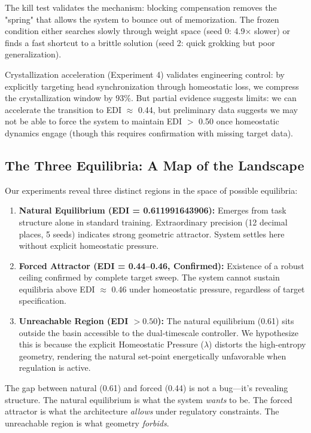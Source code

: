 The kill test validates the mechanism: blocking compensation removes the "spring" that allows the system to bounce out of memorization. The frozen condition either searches slowly through weight space (seed 0: 4.9× slower) or finds a fast shortcut to a brittle solution (seed 2: quick grokking but poor generalization).

Crystallization acceleration (Experiment 4) validates engineering control: by explicitly targeting head synchronization through homeostatic loss, we compress the crystallization window by 93\%. But partial evidence suggests limits: we can accelerate the transition to EDI $\approx$ 0.44, but preliminary data suggests we may not be able to force the system to maintain EDI $>$ 0.50 once homeostatic dynamics engage (though this requires confirmation with missing target data).

\subsection{The Three Equilibria: A Map of the Landscape}

Our experiments reveal three distinct regions in the space of possible equilibria:

\begin{enumerate}
\item \textbf{Natural Equilibrium (EDI = 0.611991643906):} Emerges from task structure alone in standard training. Extraordinary precision (12 decimal places, 5 seeds) indicates strong geometric attractor. System settles here without explicit homeostatic pressure.

\item \textbf{Forced Attractor (EDI = 0.44--0.46, Confirmed):} Existence of a robust ceiling confirmed by complete target sweep. The system cannot sustain equilibria above EDI $\approx$ 0.46 under homeostatic pressure, regardless of target specification.

\item \textbf{Unreachable Region (EDI $> 0.50$):} The natural equilibrium (0.61) sits outside the basin accessible to the dual-timescale controller. We hypothesize this is because the explicit Homeostatic Pressure ($\lambda$) distorts the high-entropy geometry, rendering the natural set-point energetically unfavorable when regulation is active.
\end{enumerate}

The gap between natural (0.61) and forced (0.44) is not a bug—it's revealing structure. The natural equilibrium is what the system \emph{wants} to be. The forced attractor is what the architecture \emph{allows} under regulatory constraints. The unreachable region is what geometry \emph{forbids}.

